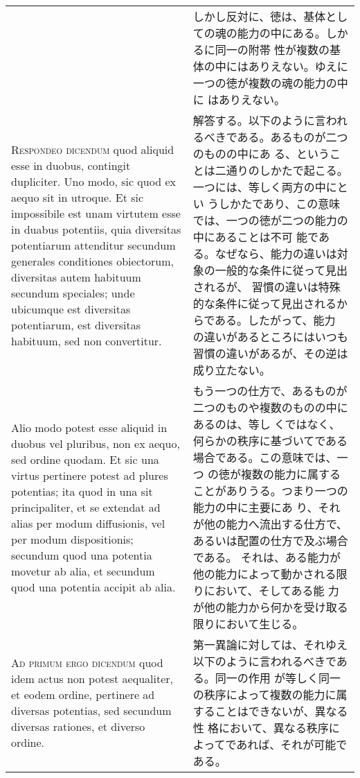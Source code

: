 \documentclass[10pt]{jsarticle}
\begin{document}
\begin{longtable}{p{21em}p{21em}}
&

しかし反対に、徳は、基体としての魂の能力の中にある。しかるに同一の附帯
性が複数の基体の中にはありえない。ゆえに一つの徳が複数の魂の能力の中に
はありえない。

\\

{\scshape Respondeo dicendum} quod aliquid esse in duobus, contingit
dupliciter. Uno modo, sic quod ex aequo sit in utroque. Et sic
impossibile est unam virtutem esse in duabus potentiis, quia
diversitas potentiarum attenditur secundum generales conditiones
obiectorum, diversitas autem habituum secundum speciales; unde
ubicumque est diversitas potentiarum, est diversitas habituum, sed non
convertitur.

&

解答する。以下のように言われるべきである。あるものが二つのものの中にあ
る、ということは二通りのしかたで起こる。一つには、等しく両方の中にとい
うしかたであり、この意味では、一つの徳が二つの能力の中にあることは不可
能である。なぜなら、能力の違いは対象の一般的な条件に従って見出されるが、
習慣の違いは特殊的な条件に従って見出されるからである。したがって、能力
の違いがあるところにはいつも習慣の違いがあるが、その逆は成り立たない。

\\

Alio modo potest esse aliquid in duobus vel pluribus, non ex aequo,
sed ordine quodam. Et sic una virtus pertinere potest ad plures
potentias; ita quod in una sit principaliter, et se extendat ad alias
per modum diffusionis, vel per modum dispositionis; secundum quod una
potentia movetur ab alia, et secundum quod una potentia accipit ab
alia.

&

もう一つの仕方で、あるものが二つのものや複数のものの中にあるのは、等し
くではなく、何らかの秩序に基づいてである場合である。この意味では、一つ
の徳が複数の能力に属することがありうる。つまり一つの能力の中に主要にあ
り、それが他の能力へ流出する仕方で、あるいは配置の仕方で及ぶ場合である。
それは、ある能力が他の能力によって動かされる限りにおいて、そしてある能
力が他の能力から何かを受け取る限りにおいて生じる。

\\

{\scshape Ad primum ergo dicendum} quod idem actus non potest
aequaliter, et eodem ordine, pertinere ad diversas potentias, sed
secundum diversas rationes, et diverso ordine.

&

第一異論に対しては、それゆえ以下のように言われるべきである。同一の作用
が等しく同一の秩序によって複数の能力に属することはできないが、異なる性
格において、異なる秩序によってであれば、それが可能である。


\end{longtable}
\end{document}
